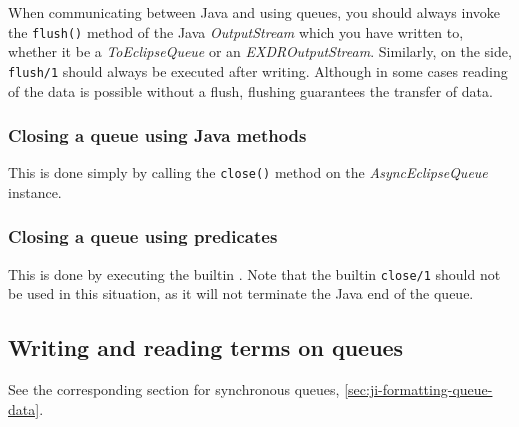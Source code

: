 When communicating between Java and {\eclipse} using queues, you
should always invoke the {\tt flush()} method of the Java {\it
OutputStream} which you have written to, whether it be a {\it
ToEclipseQueue} or an {\it EXDROutputStream}. Similarly, on the
{\eclipse} side, {\tt flush/1} should always be executed after
writing. Although in some cases reading of the data is possible
without a flush, flushing guarantees the transfer of data.

\subsubsection*{Closing a queue using Java methods}

This is done simply by calling the {\tt close()} method on the {\it
AsyncEclipseQueue} instance.

\subsubsection*{Closing a queue using {\eclipse} predicates}
This is done by executing the builtin . Note
that the builtin {\tt close/1} should not be used in this situation,
as it will not terminate the Java end of the queue.

\subsection{Writing and reading {\eclipse} terms on queues}
See the corresponding section for synchronous queues, 
\ref{sec:ji-formatting-queue-data}.


